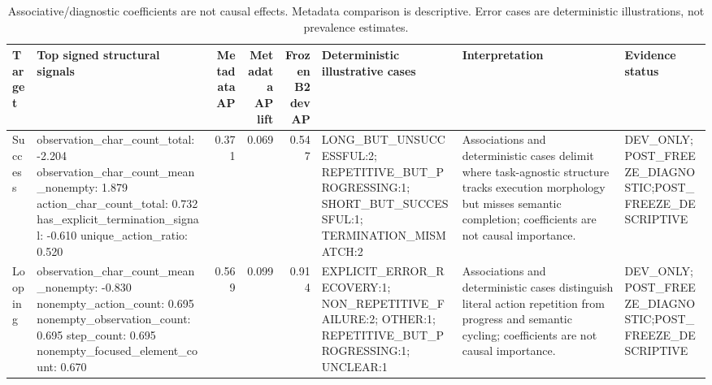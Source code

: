 \begin{table}[t]
\centering
\scriptsize
\caption{Associative/diagnostic coefficients are not causal effects. Metadata comparison is descriptive. Error cases are deterministic illustrations, not prevalence estimates.}
\label{tab:interpretability-failure-summary}
\begin{tabular}{lp{}rrrp{}p{}p{}}
\hline
Target & Top signed structural signals & Metadata AP & Metadata AP lift & Frozen B2 dev AP & Deterministic illustrative cases & Interpretation & Evidence status \\
\hline
Success & observation\_char\_count\_total: -2.204 \newline observation\_char\_count\_mean\_nonempty: 1.879 \newline action\_char\_count\_total: 0.732 \newline has\_explicit\_termination\_signal: -0.610 \newline unique\_action\_ratio: 0.520 & 0.371 & 0.069 & 0.547 & LONG\_BUT\_UNSUCCESSFUL:2; REPETITIVE\_BUT\_PROGRESSING:1; SHORT\_BUT\_SUCCESSFUL:1; TERMINATION\_MISMATCH:2 & Associations and deterministic cases delimit where task-agnostic structure tracks execution morphology but misses semantic completion; coefficients are not causal importance. & DEV\_ONLY;POST\_FREEZE\_DIAGNOSTIC;POST\_FREEZE\_DESCRIPTIVE \\
Looping & observation\_char\_count\_mean\_nonempty: -0.830 \newline nonempty\_action\_count: 0.695 \newline nonempty\_observation\_count: 0.695 \newline step\_count: 0.695 \newline nonempty\_focused\_element\_count: 0.670 & 0.569 & 0.099 & 0.914 & EXPLICIT\_ERROR\_RECOVERY:1; NON\_REPETITIVE\_FAILURE:2; OTHER:1; REPETITIVE\_BUT\_PROGRESSING:1; UNCLEAR:1 & Associations and deterministic cases distinguish literal action repetition from progress and semantic cycling; coefficients are not causal importance. & DEV\_ONLY;POST\_FREEZE\_DIAGNOSTIC;POST\_FREEZE\_DESCRIPTIVE \\
\hline
\end{tabular}
\end{table}
